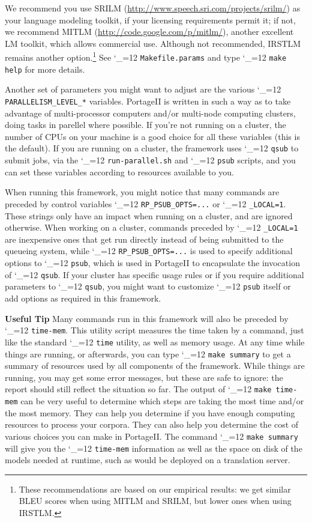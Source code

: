 \documentclass[11pt,letterpaper]{article}
\newcommand{\PS}{PortageII\xspace}
\def\code{\begingroup\catcode`\_=12 \codex}
\newcommand{\codex}[1]{\texttt{#1}\endgroup}
\newcommand{\tip}{\textbf{Useful Tip \large{\ding{43}} }}
\newcommand{\margintip}{\marginpar[{\textbf{Tip \large{\ding{43}}}}]{\textbf{\reflectbox{\large{\ding{43}}} Tip}}}
\newcommand{\tipend}{\textbf{ \reflectbox{\large{\ding{43}}}}}
\begin{document}
We recommend you use SRILM (\url{http://www.speech.sri.com/projects/srilm/}) as
your language modeling toolkit, if your licensing requirements permit it; if
not, we recommend MITLM (\url{http://code.google.com/p/mitlm/}), another
excellent LM toolkit, which allows commercial use.  Although not recommended,
IRSTLM remains another option.\footnote{These recommendations are based on our
empirical results: we get similar BLEU scores when using MITLM and SRILM, but
lower ones when using IRSTLM.} See \code{Makefile.params} and type \code{make
help} for more details.

Another set of parameters you might want to adjust are the various
\code{PARALLELISM_LEVEL_*} variables.  \PS is written in such a way as to take
advantage of multi-processor computers and/or multi-node computing clusters,
doing tasks in parellel where possible.  If you're not running on a cluster,
the number of CPUs on your machine is a good choice for all these variables
(this is the default).  If you are running on a cluster, the framework uses
\code{qsub} to submit jobs, via the \code{run-parallel.sh} and \code{psub}
scripts, and you can set these variables according to resources available to
you.

When running this framework, you might notice that many commands are preceded
by control variables \code{RP_PSUB_OPTS=...} or \code{_LOCAL=1}.  These strings
only have an impact when running on a cluster, and are ignored otherwise.  When
working on a cluster, commands preceded by \code{_LOCAL=1} are inexpensive ones
that get run directly instead of being submitted to the queueing system, while
\code{RP_PSUB_OPTS=...} is used to specify additional options to \code{psub},
which is used in \PS to encapsulate the invocation of \code{qsub}.  If your
cluster has specific usage rules or if you require additional parameters to
\code{qsub}, you might want to customize \code{psub} itself or add options as
required in this framework.

\tip\margintip Many commands run in this framework will also be preceded by
\code{time-mem}. This utility script measures the time taken by a command, just
like the standard \code{time} utility, as well as memory usage. At any time
while things are running, or afterwards, you can type \code{make summary} to
get a summary of resources used by all components of the framework. While things
are running, you may get some error messages, but these are safe to ignore: the
report should still reflect the situation so far.  The output of \code{make
time-mem} can be very useful to determine which steps are taking the most time
and/or the most memory.  They can help you determine if you have enough
computing resources to process your corpora.  They can also help you determine
the cost of various choices you can make in \PS.  The command \code{make
summary} will give you the \code{time-mem} information as well as the space on
disk of the models needed at runtime, such as would be deployed on a
translation server.\tipend
\end{document}

